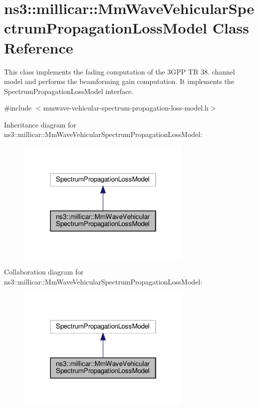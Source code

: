 \hypertarget{classns3_1_1millicar_1_1MmWaveVehicularSpectrumPropagationLossModel}{}\section{ns3\+:\+:millicar\+:\+:Mm\+Wave\+Vehicular\+Spectrum\+Propagation\+Loss\+Model Class Reference}
\label{classns3_1_1millicar_1_1MmWaveVehicularSpectrumPropagationLossModel}


This class implements the fading computation of the 3\+G\+PP TR 38. channel model and performs the beamforming gain computation. It implements the Spectrum\+Propagation\+Loss\+Model interface.  




{\ttfamily \#include $<$mmwave-\/vehicular-\/spectrum-\/propagation-\/loss-\/model.\+h$>$}



Inheritance diagram for ns3\+:\+:millicar\+:\+:Mm\+Wave\+Vehicular\+Spectrum\+Propagation\+Loss\+Model\+:\nopagebreak
\begin{figure}[H]
\begin{center}
\leavevmode
\includegraphics[width=238pt]{classns3_1_1millicar_1_1MmWaveVehicularSpectrumPropagationLossModel__inherit__graph}
\end{center}
\end{figure}


Collaboration diagram for ns3\+:\+:millicar\+:\+:Mm\+Wave\+Vehicular\+Spectrum\+Propagation\+Loss\+Model\+:\nopagebreak
\begin{figure}[H]
\begin{center}
\leavevmode
\includegraphics[width=238pt]{classns3_1_1millicar_1_1MmWaveVehicularSpectrumPropagationLossModel__coll__graph}
\end{center}
\end{figure}
